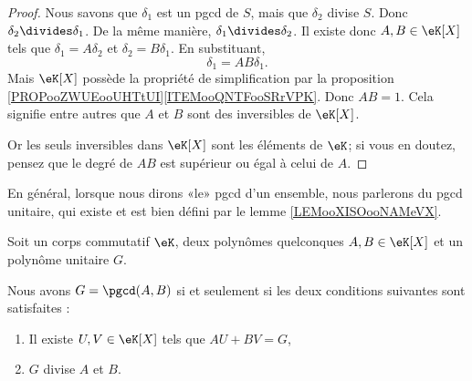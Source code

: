 \begin{proof}
    Nous savons que \( \delta_1\) est un pgcd de \( S\), mais que \( \delta_2\) divise \( S\). Donc \( \delta_2\divides \delta_1\). De la même manière, \( \delta_1\divides \delta_2\). Il existe donc \( A,B\in \eK[X]\) tels que \( \delta_1=A\delta_2\) et \( \delta_2=B\delta_1\). En substituant,
    \begin{equation}
        \delta_1=AB\delta_1.
    \end{equation}
    Mais \( \eK[X]\) possède la propriété de simplification par la proposition \ref{PROPooZWUEooUHTtUI}\ref{ITEMooQNTFooSRrVPK}. Donc \( AB=1\). Cela signifie entre autres que \( A\) et \( B\) sont des inversibles de \( \eK[X]\).

    Or les seuls inversibles dans \( \eK[X]\) sont les éléments de \( \eK\); si vous en doutez, pensez que le degré de \( AB\) est supérieur ou égal à celui de \( A\).
\end{proof}

\begin{normaltext}
    En général, lorsque nous dirons «le» pgcd d'un ensemble, nous parlerons du pgcd unitaire, qui existe et est bien défini par le lemme \ref{LEMooXISOooNAMeVX}.
\end{normaltext}


\begin{lemma}        \label{LEMooIAGMooHUQtUs}
    Soit un corps commutatif \( \eK\), deux polynômes quelconques \( A,B\in \eK[X]\) et un polynôme unitaire \( G\).
    
    Nous avons \( G=\pgcd(A,B)\) si et seulement si les deux conditions suivantes sont satisfaites :
    \begin{enumerate}
        \item
            Il existe \( U,V\in \eK[X]\) tels que \( AU+BV=G\),
        \item
            \( G\) divise \( A\) et \( B\).
    \end{enumerate}
\end{lemma}

